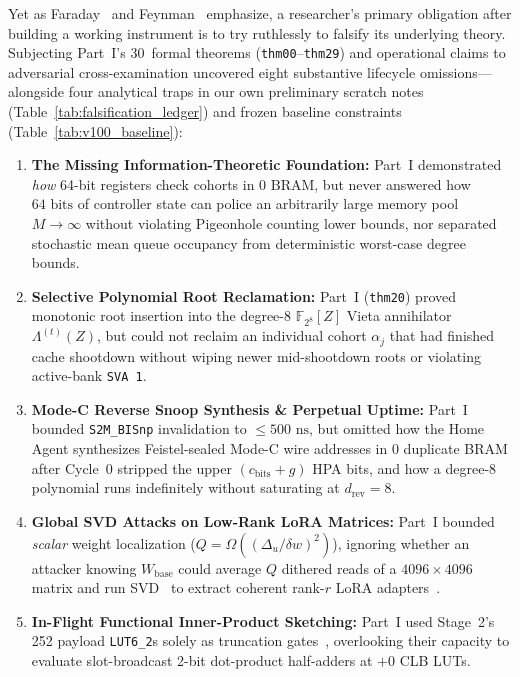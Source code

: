 \documentclass[10pt,twocolumn]{article}
\providecommand{\LeanPartOneTotal}{30}
\theoremstyle{spectralthm}
\begin{document}
Yet as Faraday~\cite{faraday1854mental} and Feynman~\cite{feynman1974cargocult} emphasize, a researcher's primary obligation after building a working instrument is to try ruthlessly to falsify its underlying theory. Subjecting Part~I's \LeanPartOneTotal\ formal theorems (\texttt{thm00}--\texttt{thm29}) and operational claims to adversarial cross-examination uncovered eight substantive lifecycle omissions---alongside four analytical traps in our own preliminary scratch notes (Table~\ref{tab:falsification_ledger}) and frozen baseline constraints (Table~\ref{tab:v100_baseline}):
\begin{enumerate}
  \item \textbf{The Missing Information-Theoretic Foundation:} Part~I demonstrated \emph{how} 64-bit registers check cohorts in $0\text{~BRAM}$, but never answered how $64\text{~bits}$ of controller state can police an arbitrarily large memory pool $M \to \infty$ without violating Pigeonhole counting lower bounds, nor separated stochastic mean queue occupancy from deterministic worst-case degree bounds.
  \item \textbf{Selective Polynomial Root Reclamation:} Part~I (\texttt{thm20}) proved monotonic root insertion into the degree-8 $\mathbb{F}_{2^8}[Z]$ Vieta annihilator $\Lambda^{(t)}(Z)$, but could not reclaim an individual cohort $\alpha_j$ that had finished cache shootdown without wiping newer mid-shootdown roots or violating active-bank \texttt{SVA 1}.
  \item \textbf{Mode-C Reverse Snoop Synthesis \& Perpetual Uptime:} Part~I bounded \texttt{S2M\_BISnp} invalidation to $\le 500\text{~ns}$, but omitted how the Home Agent synthesizes Feistel-sealed Mode-C wire addresses in $0$ duplicate BRAM after Cycle~0 stripped the upper $(c_{\mathrm{bits}}+g)$ HPA bits, and how a degree-8 polynomial runs indefinitely without saturating at $d_{\mathrm{rev}}=8$.
  \item \textbf{Global SVD Attacks on Low-Rank LoRA Matrices:} Part~I bounded \emph{scalar} weight localization ($Q = \Omega((\Delta_u/\delta w)^2)$), ignoring whether an attacker knowing $W_{\mathrm{base}}$ could average $Q$ dithered reads of a $4096 \times 4096$ matrix and run SVD~\cite{carlini2024stealing} to extract coherent rank-$r$ LoRA adapters~\cite{hu2022lora}.
  \item \textbf{In-Flight Functional Inner-Product Sketching:} Part~I used Stage~2's 252 payload \mbox{\texttt{LUT6\_2}}s solely as truncation gates~\cite{rouhani2023microscaling}, overlooking their capacity to evaluate slot-broadcast 2-bit dot-product half-adders at $+0$ CLB LUTs.

\end{enumerate}
\end{document}
